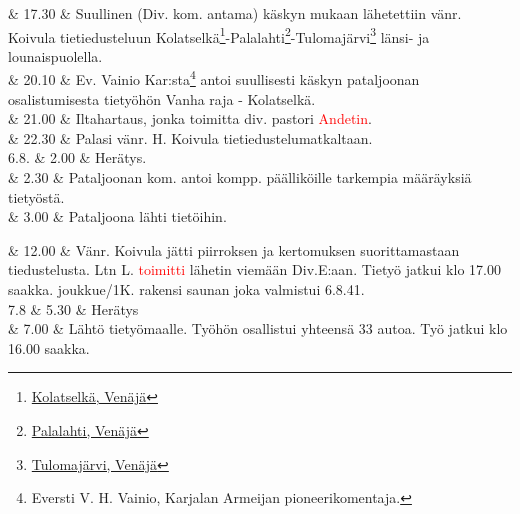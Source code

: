 \documentclass[11pt,a5paper,oneside]{book}
\begin{document}

& 17.30 & Suullinen (Div. kom. antama) käskyn mukaan lähetettiin vänr. Koivula tietiedusteluun Kolatselkä\footnote{\href{https://www.google.fi/maps/place/Kolatsel'ga,+Republic+of+Karelia,+Russia,+186148/}{Kolatselkä, Venäjä}}-Palalahti\footnote{\href{https://www.google.fi/maps/place/Palalakhta,+Republic+of+Karelia,+Russia,+186148/}{Palalahti, Venäjä}}-Tulomajärvi\footnote{\href{https://www.google.fi/maps/place/Ozero+Tulmozero/}{Tulomajärvi, Venäjä}} länsi- ja lounaispuolella. \newline \\

& 20.10 & Ev. Vainio Kar:sta\footnote{Eversti V. H. Vainio, Karjalan Armeijan pioneerikomentaja.} antoi suullisesti käskyn pataljoonan osalistumisesta tietyöhön Vanha raja - Kolatselkä. \\

& 21.00 & Iltahartaus, jonka toimitta div. pastori \textcolor{red}{Andetin}. \\

& 22.30 & Palasi vänr. H. Koivula tietiedustelumatkaltaan. \newline\newline\newline\newline\newline \\

6.8. & 2.00 & Herätys. \\

& 2.30 & Pataljoonan kom. antoi kompp. päälliköille tarkempia määräyksiä tietyöstä. \\

& 3.00 & Pataljoona lähti tietöihin. \\
\newpage

& 12.00 & Vänr. Koivula jätti piirroksen ja kertomuksen suorittamastaan tiedustelusta. Ltn L. \textcolor{red}{toimitti} lähetin viemään Div.E:aan. Tietyö jatkui klo 17.00 saakka.  joukkue/1K. rakensi saunan joka valmistui 6.8.41. \newline\newline \\

7.8 & 5.30 & Herätys \\

& 7.00 & Lähtö tietyömaalle. Työhön osallistui yhteensä 33 autoa. \newline Työ jatkui klo 16.00 saakka. \\
\end{document}
